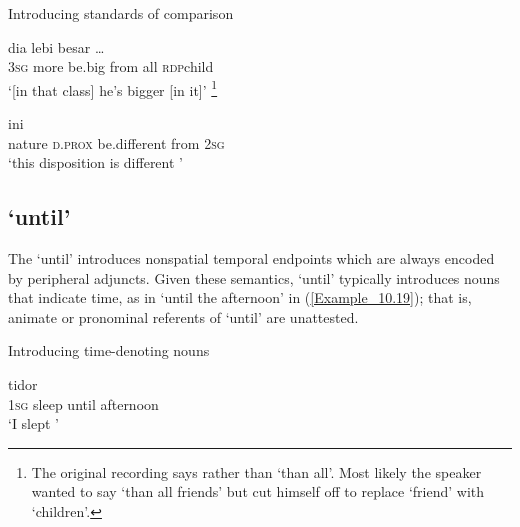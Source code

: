 \begin{styleExampleTitle}
Introducing standards of comparison
\end{styleExampleTitle}

\ea
\label{Example_10.17}
\gll {\ldots} {dia} {lebi} {besar} {} {} {} {\ldots}\\ %
 {}   \textsc{3sg}  more  be.big  from  all  \textsc{rdp}{\Tilde}child  \\
\glt 
‘[in that class] he’s bigger  [in it]’ \textstyleExampleSource{[081109-003-JR.0001]}\footnote{The original recording says  rather than  ‘than all’. Most likely the speaker wanted to say  ‘than all friends’ but cut himself off to replace  ‘friend’ with  ‘children’.}
\z

\ea
\label{Example_10.18}
 {ini} {} {} {}\\ %
 nature  \textsc{d.prox}  be.different  from  \textsc{2sg}\\
\glt
‘this disposition is different ’ \textstyleExampleSource{[081110-008-CvNP.0089]}
\z

\subsection{ ‘until’}
\label{Para_10.1.4}
The   ‘until’ introduces nonspatial temporal endpoints which are always encoded by peripheral adjuncts. Given these semantics,  ‘until’ typically introduces nouns that indicate time, as in  ‘until the afternoon’ in (\ref{Example_10.19}); that is, animate or pronominal referents of  ‘until’ are unattested.


\begin{styleExampleTitle}
Introducing time-denoting nouns
\end{styleExampleTitle}

\ea
\label{Example_10.19}
 {tidor} {} {}\\ %
 \textsc{1sg}  sleep  until  afternoon\\
\glt 
‘I slept ’ \textstyleExampleSource{[081015-005-NP.0033]}
\z


